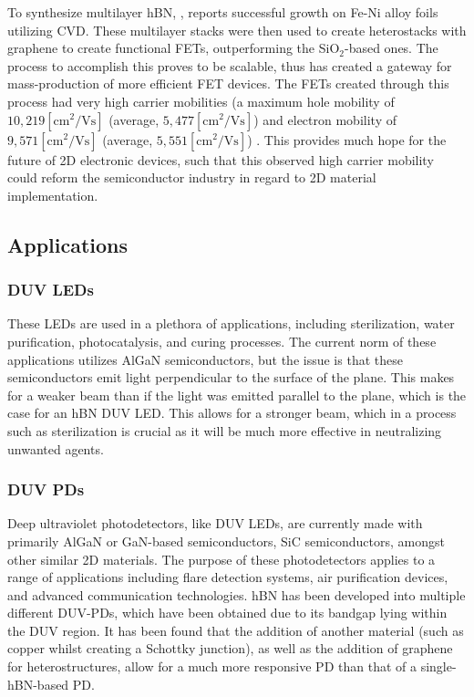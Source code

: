 \documentclass[conference]{IEEEtran}
\begin{document}
To synthesize multilayer hBN, \cite{b11}, reports successful growth on Fe-Ni alloy foils utilizing CVD. These multilayer stacks were then used to create heterostacks with graphene to create functional FETs, outperforming the SiO$_2$-based ones. The process to accomplish this proves to be scalable, thus has created a gateway for mass-production of more efficient FET devices. The FETs created through this process had very high carrier mobilities (a maximum hole mobility of $10,219 [\si{\centi\meter\squared\per\volt\second}]$ (average, $5,477[\si{\centi\meter\squared\per\volt\second}]$) and electron mobility of $9,571[\si{\centi\meter\squared\per\volt\second}]$ (average, $5,551[\si{\centi\meter\squared\per\volt\second}]$) \cite{b11}. This provides much hope for the future of 2D electronic devices, such that this observed high carrier mobility could reform the semiconductor industry in regard to 2D material implementation.

  \subsection{Applications}

  \subsubsection{DUV LEDs}

These LEDs are used in a plethora of applications, including sterilization, water purification, photocatalysis, and curing processes. The current norm of these applications utilizes AlGaN semiconductors, but the issue is that these semiconductors emit light perpendicular to the surface of the plane. This makes for a weaker beam than if the light was emitted parallel to the plane, which is the case for an hBN DUV LED. This allows for a stronger beam, which in a process such as sterilization is crucial as it will be much more effective in neutralizing unwanted agents.

  \subsubsection{DUV PDs}

Deep ultraviolet photodetectors, like DUV LEDs, are currently made with primarily AlGaN or GaN-based semiconductors, SiC semiconductors, amongst other similar 2D materials. The purpose of these photodetectors applies to a range of applications including flare detection systems, air purification devices, and advanced communication technologies. hBN has been developed into multiple different DUV-PDs, which have been obtained due to its bandgap lying within the DUV region. It has been found that the addition of another material (such as copper whilst creating a Schottky junction), as well as the addition of graphene for heterostructures, allow for a much more responsive PD than that of a single-hBN-based PD.
\end{document}
